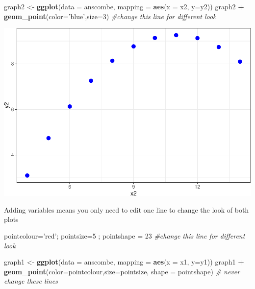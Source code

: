 \documentclass[]{book}
\newenvironment{Shaded}{\begin{snugshade}}{\end{snugshade}}
\newcommand{\KeywordTok}[1]{\textcolor[rgb]{0.13,0.29,0.53}{\textbf{#1}}}
\newcommand{\DataTypeTok}[1]{\textcolor[rgb]{0.13,0.29,0.53}{#1}}
\newcommand{\DecValTok}[1]{\textcolor[rgb]{0.00,0.00,0.81}{#1}}
\newcommand{\StringTok}[1]{\textcolor[rgb]{0.31,0.60,0.02}{#1}}
\newcommand{\CommentTok}[1]{\textcolor[rgb]{0.56,0.35,0.01}{\textit{#1}}}
\newcommand{\OperatorTok}[1]{\textcolor[rgb]{0.81,0.36,0.00}{\textbf{#1}}}
\newcommand{\NormalTok}[1]{#1}
\begin{document}
\begin{Shaded}
\begin{Highlighting}[]
\NormalTok{graph2 <-}\StringTok{ }\KeywordTok{ggplot}\NormalTok{(}\DataTypeTok{data =}\NormalTok{ anscombe, }\DataTypeTok{mapping =} \KeywordTok{aes}\NormalTok{(}\DataTypeTok{x =}\NormalTok{ x2, }\DataTypeTok{y=}\NormalTok{y2))}
\NormalTok{graph2 }\OperatorTok{+}\StringTok{ }\KeywordTok{geom_point}\NormalTok{(}\DataTypeTok{color=}\StringTok{'blue'}\NormalTok{,}\DataTypeTok{size=}\DecValTok{3}\NormalTok{) }\CommentTok{#change this line for different look}
\end{Highlighting}
\end{Shaded}

\begin{center}\includegraphics[width=1\linewidth]{007-coding_files/figure-latex/unnamed-chunk-26-1} \end{center}

Adding variables means you only need to edit one line to change the look
of both plots

\begin{Shaded}
\begin{Highlighting}[]
\NormalTok{pointcolour=}\StringTok{'red'}\NormalTok{; pointsize=}\DecValTok{5}\NormalTok{ ; pointshape =}\StringTok{ }\DecValTok{23} \CommentTok{#change this line for different look}

\NormalTok{graph1 <-}\StringTok{ }\KeywordTok{ggplot}\NormalTok{(}\DataTypeTok{data =}\NormalTok{ anscombe, }\DataTypeTok{mapping =} \KeywordTok{aes}\NormalTok{(}\DataTypeTok{x =}\NormalTok{ x1, }\DataTypeTok{y=}\NormalTok{y1)) }
\NormalTok{graph1 }\OperatorTok{+}\StringTok{ }\KeywordTok{geom_point}\NormalTok{(}\DataTypeTok{color=}\NormalTok{pointcolour,}\DataTypeTok{size=}\NormalTok{pointsize, }\DataTypeTok{shape =}\NormalTok{ pointshape) }\CommentTok{# never change these lines}
\end{Highlighting}
\end{Shaded}
\end{document}
